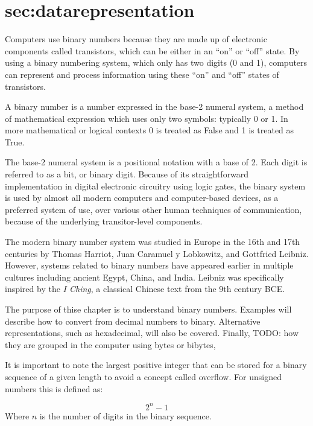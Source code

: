 \documentclass[letterpaper, 10pt]{book}
\begin{document}
\chapter{sec:datarepresentation}

Computers use binary numbers because they are made up of electronic components called transistors, 
which can be either in an ``on'' or ``off'' state. By using a binary numbering system, which only 
has two digits (0 and 1), computers can represent and process information using these ``on'' and 
``off'' states of transistors.

A binary number is a number expressed in the base-2 numeral system, a method of mathematical 
expression which uses only two symbols: typically 0 or 1. In more mathematical or logical contexts 
0 is treated as False and 1 is treated as True.

The base-2 numeral system is a positional notation with a base of 2. Each digit is referred to as 
a bit, or binary digit. Because of its straightforward implementation in digital electronic 
circuitry using logic gates, the binary system is used by almost all modern computers and 
computer-based devices, as a preferred system of use, over various other human techniques of 
communication, because of the underlying transitor-level components.

The modern binary number system was studied in Europe in the 16th and 17th centuries by Thomas 
Harriot, Juan Caramuel y Lobkowitz, and Gottfried Leibniz. However, systems related to binary 
numbers have appeared earlier in multiple cultures including ancient Egypt, China, and India. 
Leibniz was specifically inspired by the \textit{I Ching}, a classical Chinese text from the 9th century BCE. 

The purpose of thise chapter is to understand binary numbers. Examples will describe how to convert
from decimal numbers to binary. Alternative representations, such as hexadecimal, will also be
covered. Finally, TODO: how they are grouped in the computer using bytes or bibytes, 



It is important to note the largest positive integer that can be stored for a binary sequence of a 
given length to avoid a concept called \gls{overflow}. For \gls{unsigned} numbers this is defined as: %

%
\begin{equation} \label{eq:sizeofunsignedint}
    2^n - 1
\end{equation}
%
Where $n$ is the number of digits in the binary sequence. 
\end{document}

